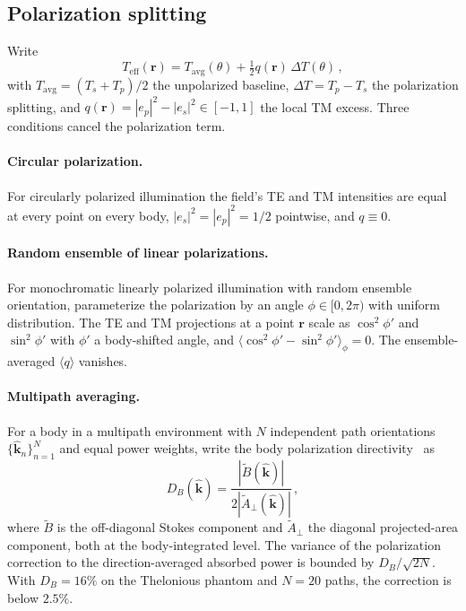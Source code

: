 \documentclass[journal,twocolumn,10pt]{IEEEtran}
\theoremstyle{plain}
\theoremstyle{remark}
\newcommand{\khat}{\hat{\bm{k}}}
\newcommand{\rr}{\mathbf{r}}
\newcommand{\Teff}{T_{\mathrm{eff}}}
\newcommand{\Tavg}{T_{\mathrm{avg}}}
\begin{document}
\subsection{Polarization splitting}
Write
\begin{equation}\label{eq:Teff-decomp-SI}
  \Teff(\rr) = \Tavg(\theta) + \tfrac{1}{2}q(\rr)\,\Delta T(\theta)\, ,
\end{equation}
with $\Tavg = (T_s + T_p)/2$ the unpolarized baseline,
$\Delta T = T_p - T_s$ the polarization splitting, and
$q(\rr) = |e_p|^2 - |e_s|^2 \in [-1,1]$ the local TM excess. Three
conditions cancel the polarization term.

\paragraph{Circular polarization.} For circularly polarized
illumination the field's TE and TM intensities are equal at every
point on every body, $|e_s|^2 = |e_p|^2 = 1/2$ pointwise, and
$q \equiv 0$.

\paragraph{Random ensemble of linear polarizations.} For
monochromatic linearly polarized illumination with random ensemble
orientation, parameterize the polarization by an angle
$\phi \in [0, 2\pi)$ with uniform distribution. The TE and TM
projections at a point $\rr$ scale as $\cos^2\phi'$ and $\sin^2\phi'$
with $\phi'$ a body-shifted angle, and $\langle\cos^2\phi' -
\sin^2\phi'\rangle_\phi = 0$. The ensemble-averaged $\langle q \rangle$
vanishes.

\paragraph{Multipath averaging.} For a body in a multipath
environment with $N$ independent path orientations
$\{\khat_n\}_{n=1}^N$ and equal power weights, write the body
polarization directivity~\cite{Diao2024} as
\begin{equation}\label{eq:DB}
  D_B(\khat) = \frac{|\tilde{B}(\khat)|}{2|\tilde{A}_\perp(\khat)|}\, ,
\end{equation}
where $\tilde{B}$ is the off-diagonal Stokes component and
$\tilde{A}_\perp$ the diagonal projected-area component, both at the
body-integrated level. The variance of the polarization correction
to the direction-averaged absorbed power is bounded by
$D_B / \sqrt{2N}$. With $D_B = 16\%$ on the Thelonious phantom and
$N = 20$ paths, the correction is below $2.5\%$.
\end{document}
